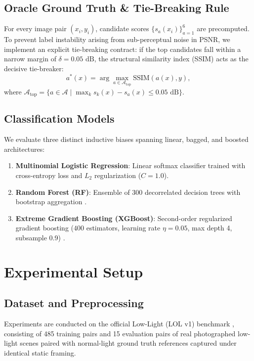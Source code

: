 \documentclass[journal]{IEEEtran}
\begin{document}
\subsection{Oracle Ground Truth \& Tie-Breaking Rule}
For every image pair $(x_i, y_i)$, candidate scores $\{s_a(x_i)\}_{a=1}^6$ are precomputed. To prevent label instability arising from sub-perceptual noise in PSNR, we implement an explicit tie-breaking contract: if the top candidates fall within a narrow margin of $\delta = 0.05\text{ dB}$, the structural similarity index (SSIM) acts as the decisive tie-breaker:
\begin{equation}
a^*(x) = \arg\max_{a \in \mathcal{A}_{\text{top}}} \text{SSIM}(a(x), y),
\end{equation}
where $\mathcal{A}_{\text{top}} = \{a \in \mathcal{A} \mid \max_k s_k(x) - s_a(x) \le 0.05\text{ dB}\}$.

\subsection{Classification Models}
We evaluate three distinct inductive biases spanning linear, bagged, and boosted architectures:
\begin{enumerate}
    \item \textbf{Multinomial Logistic Regression}: Linear softmax classifier trained with cross-entropy loss and $L_2$ regularization ($C=1.0$).
    \item \textbf{Random Forest (RF)}: Ensemble of 300 decorrelated decision trees with bootstrap aggregation \cite{breiman2001random}.
    \item \textbf{Extreme Gradient Boosting (XGBoost)}: Second-order regularized gradient boosting ($400$ estimators, learning rate $\eta=0.05$, max depth 4, subsample 0.9) \cite{chen2016xgboost}.
\end{enumerate}

\section{Experimental Setup}

\subsection{Dataset and Preprocessing}
Experiments are conducted on the official Low-Light (LOL v1) benchmark \cite{wei2018deep}, consisting of 485 training pairs and 15 evaluation pairs of real photographed low-light scenes paired with normal-light ground truth references captured under identical static framing.
\end{document}
